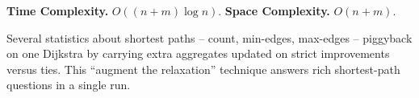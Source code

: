 \begin{complexitybox}
\textbf{Time Complexity.} $O((n+m)\log n)$. \textbf{Space Complexity.}
$O(n+m)$.
\end{complexitybox}

\begin{takeawaybox}
Several statistics about shortest paths -- count, min-edges, max-edges --
piggyback on one Dijkstra by carrying extra aggregates updated on strict
improvements versus ties. This ``augment the relaxation'' technique answers
rich shortest-path questions in a single run.
\end{takeawaybox}
